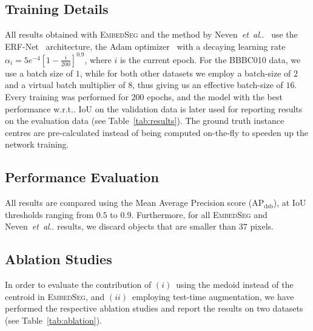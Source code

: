 \documentclass{midl}
\makeatletter
\newcommand{\EmbedSeg}{\mbox{\textsc{EmbedSeg}}\xspace}
\newcommand{\miniheadline}[1]{\noindent\textbf{#1.}}
\DeclareRobustCommand\onedot{\futurelet\@let@token\@onedot}
\def\@onedot{\ifx\@let@token.\else.\null\fi\xspace}
\def\wrt{w.r.t\onedot}
\def\etal{\emph{et~al}\onedot}
\makeatother
\begin{document}
\subsection{Training Details}
All results obtained with \EmbedSeg and the method by Neven~\etal~\cite{neven2019} use the ERF-Net~\cite{romera2018} architecture, the Adam optimizer~\cite{kingma2014adam} with a decaying learning rate $\alpha_i = 5 e^{-4}\left[1 - \frac{i}{200}\right]^{0.9}$, where $i$ is the current epoch.
For the BBBC010 data, we use a batch size of $1$, while for both other datasets we employ a batch-size of $2$ and a virtual batch multiplier of $8$, thus giving us an effective batch-size of $16$.
Every training was performed for $200$ epochs, and the model with the best performance \wrt IoU on the validation data is later used for reporting results on the evaluation data (see Table~\ref{tab:results}). The ground truth instance centres are pre-calculated instead of being computed on-the-fly to speeden up the network training. 

\subsection{Performance Evaluation}
All results are compared using the Mean Average Precision score ($\text{AP}_{\text{dsb}}$), at IoU thresholds ranging from $0.5$ to $0.9$.
Furthermore, for all \EmbedSeg and Neven~\etal results, we discard objects that are smaller than $37$ pixels.

\subsection{Ablation Studies}
In order to evaluate the contribution of
$(i)$~using the medoid instead of the centroid in \EmbedSeg, and
$(ii)$~employing test-time augmentation, 
we have performed the respective ablation studies and report the results  on  two datasets (see Table~\ref{tab:ablation}).

\end{document}
